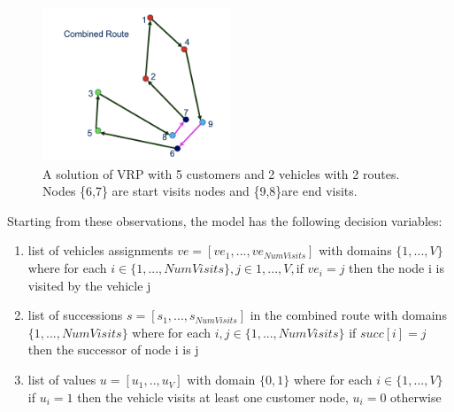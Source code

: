 \begin{figure}[h]
    \centering
    \includegraphics[width=0.5\textwidth]{images/combined-route-solution.png}
    \caption{A solution of VRP with 5 customers and 2 vehicles with 2 routes. Nodes \{6,7\} are start visits nodes and \{9,8\}are end visits.}
    \label{fig:mesh1}
\end{figure}

Starting from these observations, the model has the following decision variables:
\begin{enumerate}
    \item list of vehicles assignments \begin{math}ve = [ve_{1}, ..., ve_{NumVisits}] \end{math} with domains \begin{math}\{1,...,V\}\end{math}where for each \begin{math}i \in \{1,..., NumVisits\}, j \in {1,...,V} ,\end{math}if \begin{math} ve_{i} = j\end{math} then the node i is visited by the vehicle j
    \item list of successions \begin{math}s=[s_{1},...,s_{NumVisits}]\end{math} in the combined route with domains \begin{math}\{1,..., NumVisits\}\end{math} where for each \begin{math}i,j \in \{1,..., NumVisits\}\end{math} if \begin{math}succ[i] = j\end{math} then the successor of node i is j
    \item list of values \begin{math}u=[u_{1},.., u_{V}]\end{math} with domain \begin{math}\{0,1\}\end{math} where for each \begin{math}i \in \{1,...,V\}\end{math} if \begin{math}u_{i} = 1 \end{math} then the vehicle visits at least one customer node, \begin{math} u_{i} = 0\end{math} otherwise
\end{enumerate}
\newpage
